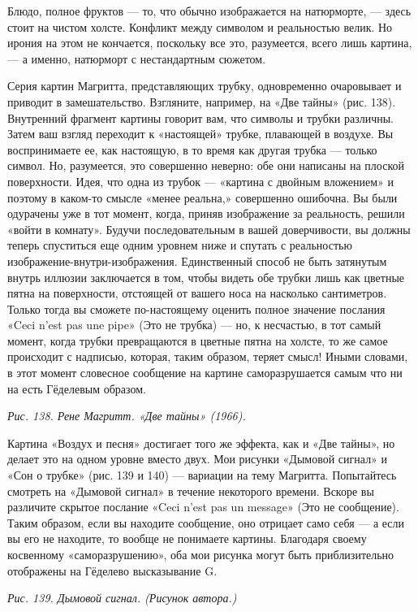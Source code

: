 Блюдо, полное фруктов --- то, что обычно изображается на натюрморте, --- здесь стоит на чистом холсте. Конфликт между символом и реальностью велик. Но ирония на этом не кончается, поскольку все это, разумеется, всего лишь картина, --- а именно, натюрморт с нестандартным сюжетом.

Серия картин Магритта, представляющих трубку, одновременно очаровывает и приводит в замешательство. Взгляните, например, на «Две тайны» (рис. 138). Внутренний фрагмент картины говорит вам, что символы и трубки различны. Затем ваш взгляд переходит к «настоящей» трубке, плавающей в воздухе. Вы воспринимаете ее, как настоящую, в то время как другая трубка --- только символ. Но, разумеется, это совершенно неверно: обе они написаны на плоской поверхности. Идея, что одна из трубок --- «картина с двойным вложением» и поэтому в каком-то смысле «менее реальна,» совершенно ошибочна. Вы были одурачены уже в тот момент, когда, приняв изображение за реальность, решили «войти в комнату». Будучи последовательным в вашей доверчивости, вы должны теперь спуститься еще одним уровнем ниже и спутать с реальностью изображение-внутри-изображения. Единственный способ не быть затянутым внутрь иллюзии заключается в том, чтобы видеть обе трубки лишь как цветные пятна на поверхности, отстоящей от вашего носа на насколько сантиметров. Только тогда вы сможете по-настоящему оценить полное значение послания «Ceci n'est pas une pipe» (Это не трубка) --- но, к несчастью, в тот самый момент, когда трубки превращаются в цветные пятна на холсте, то же самое происходит с надписью, которая, таким образом, теряет смысл! Иными словами, в этот момент словесное сообщение на картине саморазрушается самым что ни на есть Гёделевым образом.

\emph{Рис. 138. Рене Магритт. «Две тайны» (1966).}

Картина «Воздух и песня» достигает того же эффекта, как и «Две тайны», но делает это на одном уровне вместо двух. Мои рисунки «Дымовой сигнал» и «Сон о трубке» (рис. 139 и 140) --- вариации на тему Магритта. Попытайтесь смотреть на «Дымовой сигнал» в течение некоторого времени. Вскоре вы различите скрытое послание «Ceci n'est pas un message» (Это не сообщение). Таким образом, если вы находите сообщение, оно отрицает само себя --- а если вы его не находите, то вообще не понимаете картины. Благодаря своему косвенному «саморазрушению», оба мои рисунка могут быть приблизительно отображены на Гёделево высказывание G.

\emph{Рис. 139. Дымовой сигнал. (Рисунок автора.)}

